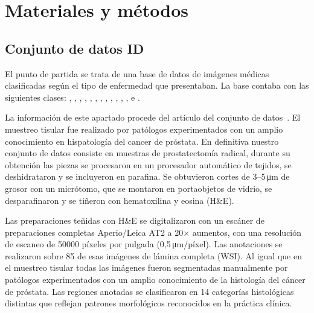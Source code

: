 %

\chapter{Materiales y métodos}\label{cap:materiales}

\section{Conjunto de datos ID}\label{sec:conjunto-id}

El punto de partida se trata de una base de datos de imágenes médicas clasificadas según el tipo de enfermedad que presentaban. La base contaba con las siguientes clases: , , , , , , , , , , , ,  e .

La información de este apartado procede del artículo del conjunto de datos~\cite{ayensa2026}. El muestreo tisular fue realizado por patólogos experimentados con un amplio conocimiento en hispatología del cancer de próstata.
En definitiva nuestro conjunto de datos consiste en muestras de prostatectomía radical, durante su obtención las piezas se procesaron en un procesador automático de tejidos, se deshidrataron y se incluyeron en parafina. Se obtuvieron cortes de 3--5\,\si{\micro\metre} de grosor con un micrótomo, que se montaron en portaobjetos de vidrio, se desparafinaron y se tiñeron con hematoxilina y eosina (H\&E).

Las preparaciones teñidas con H\&E se digitalizaron con un escáner de preparaciones completas Aperio/Leica AT2 a 20$\times$ aumentos, con una resolución de escaneo de \num{50000} píxeles por pulgada (0,5\,\si{\micro\metre}/píxel). Las anotaciones se realizaron sobre 85 de esas imágenes de lámina completa (WSI).  Al igual que en el muestreo tisular todas las imágenes fueron segmentadas manualmente por patólogos experimentados con un amplio conocimiento de la histología del cáncer de próstata. Las regiones anotadas se clasificaron en 14 categorías histológicas distintas que reflejan patrones morfológicos reconocidos en la práctica clínica.

